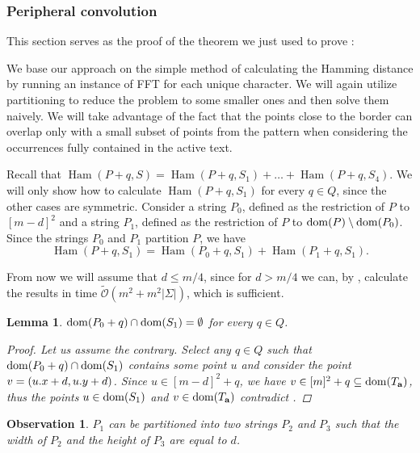 \documentclass[11pt, letterpaper]{article}
\theoremstyle{plain}
\newtheorem{lemma}{Lemma}
\newtheorem{observation}{Observation}
\theoremstyle{definition}
\theoremstyle{remark}
\newcommand{\tO}{\tilde{\mathcal{O}}}
\DeclareMathOperator*{\Ham}{Ham}
\begin{document}
\subsubsection{Peripheral convolution} \label{sigma_border_proof}

This section serves as the proof of the theorem we just used to prove : 

\SigmaBorder

We base our approach on the simple method of calculating the Hamming distance by running an instance of FFT for each unique character.
We will again utilize partitioning to reduce the problem to some smaller ones and then solve them naively.
We will take advantage of the fact that the points close to the border can overlap only with a small subset of points from the pattern when considering the occurrences fully contained in the active text.

Recall that 
$\Ham(P + q, S) = \Ham(P + q, S_1) + \dots + \Ham(P + q, S_4)$.
We will only show how to calculate $\Ham(P + q, S_1)$ for every $q \in Q$, since the other cases are symmetric.
Consider a string $P_0$, defined as the restriction of $P$ to $[m - d]^2$ and a string $P_1$, defined as the restriction of $P$ to $\operatorname*{dom}(P) \setminus \operatorname*{dom}(P_0)$.
Since the strings $P_0$ and $P_1$ partition $P$, we have
\[ \Ham(P + q, S_1) = \Ham(P_0 + q, S_1) + \Ham(P_1 + q, S_1).\]


From now we will assume that $d \le m / 4$, since for $d > m / 4$ we can, by , calculate the results in time $\tO(m^2 + m^2|\Sigma|)$, which is sufficient.


\begin{lemma}\label{border_hamming_reduction}
	$\operatorname*{dom}(P_0 + q) \cap \operatorname*{dom}(S_1) = \emptyset$ for every $q \in Q$.
	\begin{proof}
		Let us assume the contrary.
		Select any $q \in Q$ such that $\operatorname*{dom}(P_0 + q) \cap \operatorname*{dom}(S_1)$ 
		contains some point $u$ and consider the point $v = (u.x + d, u.y + d)$.
		Since $u \in [m - d]^2 + q$, we have $v \in [m]^2 + q \subseteq \operatorname*{dom}(T_\mathbf{a})$, thus the points $u \in \operatorname*{dom}(S_1)$ and $v \in \operatorname*{dom}(T_\mathbf{a})$ contradict .
	\end{proof}
\end{lemma}

\begin{observation}\label{border_hamming_split}
	$P_1$ can be partitioned into two strings $P_2$ and $P_3$ such that the width of $P_2$ and the height of $P_3$ are equal to $d$.
\end{observation}
\end{document}
